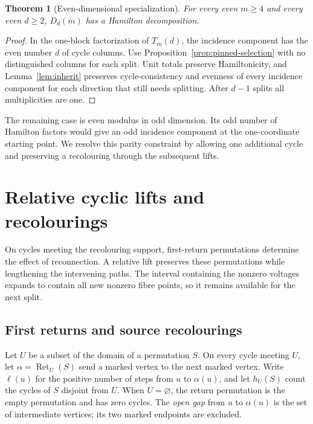\documentclass[11pt,reqno]{amsart}
\numberwithin{equation}{section}
\newtheorem{theorem}{Theorem}[section]
\theoremstyle{definition}
\theoremstyle{remark}
\newcommand{\Ret}{\operatorname{Ret}}
\begin{document}
\begin{theorem}[Even-dimensional specialization]\label{thm:even-dim}
For every even $m\ge4$ and every even $d\ge2$, $D_d(m)$ has a Hamilton
decomposition.
\end{theorem}
\begin{proof}
In the one-block factorization of $T_m(d)$, the incidence component has
the even number $d$ of cycle columns. Use
Proposition~\ref{prop:pinned-selection} with no distinguished columns for each
split. Unit totals preserve Hamiltonicity, and
Lemma~\ref{lem:inherit} preserves cycle-consistency and evenness of every
incidence component for each direction that still needs splitting.
After $d-1$ splits all multiplicities are one.
\end{proof}

The remaining case is even modulus in odd dimension. Its odd number
of Hamilton factors would give an odd incidence component at the
one-coordinate starting point. We resolve this parity constraint by
allowing one additional cycle and preserving a recolouring through
the subsequent lifts.

\section{Relative cyclic lifts and recolourings}\label{sec:relative}
On cycles meeting the recolouring support, first-return permutations
determine the effect of reconnection. A relative lift preserves these
permutations while lengthening the intervening paths. The interval
containing the nonzero voltages expands to contain all new nonzero fibre
points, so it remains available for the next split.

\subsection{First returns and source recolourings}
Let $U$ be a subset of the domain of a permutation $S$. On every cycle meeting
$U$, let $\alpha=\Ret_U(S)$ send a marked vertex to the next marked vertex. Write
$\ell(u)$ for the positive number of steps from $u$ to $\alpha(u)$, and let
$h_U(S)$ count the cycles of $S$ disjoint from $U$. When $U=\varnothing$, the
return permutation is the empty permutation and has zero cycles. The
\emph{open gap} from $u$ to $\alpha(u)$ is the set of intermediate vertices;
its two marked endpoints are excluded.
\end{document}
